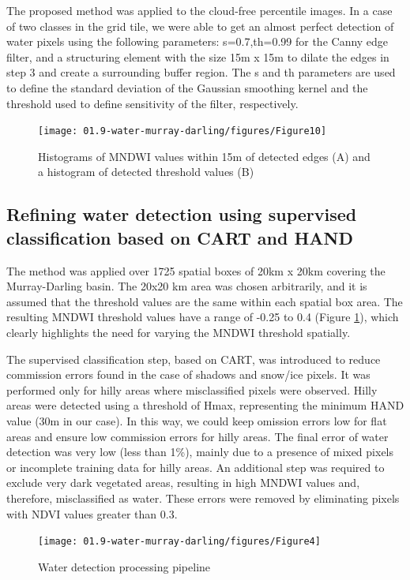 The proposed method was applied to the cloud-free percentile images. In a case of two classes in the grid tile, we were able to get an almost perfect detection of water pixels using the following parameters: s=0.7,th=0.99 for the Canny edge filter, and a structuring element with the size 15m x 15m to dilate the edges in step 3 and create a surrounding buffer region. The s and th parameters are used to define the standard deviation of the Gaussian smoothing kernel and the threshold used to define sensitivity of the filter, respectively.

\begin{figure}
	\centering
	\texttt{[image: 01.9-water-murray-darling/figures/Figure10]}
	\caption{Histograms of MNDWI values within 15m of detected edges (A) and a histogram of detected threshold values (B)}
	\label{fig:au-ndwi-values}
\end{figure}

\subsection{Refining water detection using supervised classification based on CART and HAND}
The method was applied over 1725 spatial boxes of 20km x 20km covering the Murray-Darling basin. The 20x20 km area was chosen arbitrarily, and it is assumed that the threshold values are the same within each spatial box area. The resulting MNDWI threshold values have a range of -0.25 to 0.4 (Figure \ref{fig:au-ndwi-values}), which clearly highlights the need for varying the MNDWI threshold spatially. 

The supervised classification step, based on CART, was introduced to reduce commission errors found in the case of shadows and snow/ice pixels. It was performed only for hilly areas where misclassified pixels were observed. Hilly areas were detected using a threshold of Hmax, representing the minimum HAND value (30m in our case). In this way, we could keep omission errors low for flat areas and ensure low commission errors for hilly areas. The final error of water detection was very low (less than 1\%), mainly due to a presence of mixed pixels or incomplete training data for hilly areas. An additional step was required to exclude very dark vegetated areas, resulting in high MNDWI values and, therefore, misclassified as water. These errors were removed by eliminating pixels with NDVI values greater than 0.3.

\begin{figure}
	\centering
	\texttt{[image: 01.9-water-murray-darling/figures/Figure4]}
	\caption{Water detection processing pipeline}
	\label{fig:au-pipeline}
\end{figure}

